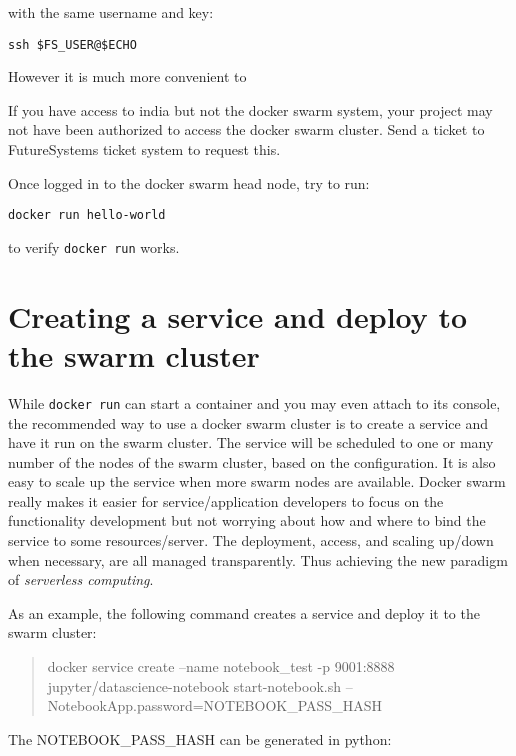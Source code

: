 with the same username and key:

\begin{lstlisting}
ssh $FS_USER@$ECHO
\end{lstlisting}

However it is much more convenient to 

\begin{NOTE}
If you have access to india but not the docker swarm
system, your project may not have been authorized to access the docker
swarm cluster. Send a ticket to FutureSystems ticket system to request
this.
\end{NOTE}

Once logged in to the docker swarm head node, try to run:

\begin{lstlisting}
docker run hello-world
\end{lstlisting}

to verify \verb|docker run| works.

\section{Creating a service and deploy to the swarm
cluster}\label{creating-a-service-and-deploy-to-the-swarm-cluster}

While \verb|docker run| can start a container and you may even attach to its
console, the recommended way to use a docker swarm cluster is to create
a service and have it run on the swarm cluster. The service will be
scheduled to one or many number of the nodes of the swarm cluster, based
on the configuration. It is also easy to scale up the service when more
swarm nodes are available. Docker swarm really makes it easier for
service/application developers to focus on the functionality development
but not worrying about how and where to bind the service to some
resources/server. The deployment, access, and scaling up/down when
necessary, are all managed transparently. Thus achieving the new
paradigm of \textit{serverless computing}.

As an example, the following command creates a service and deploy it to
the swarm cluster:

\begin{quote}
docker service create --name notebook\_test -p 9001:8888
jupyter/datascience-notebook start-notebook.sh
--NotebookApp.password=NOTEBOOK\_PASS\_HASH
\end{quote}

The NOTEBOOK\_PASS\_HASH can be generated in python:

